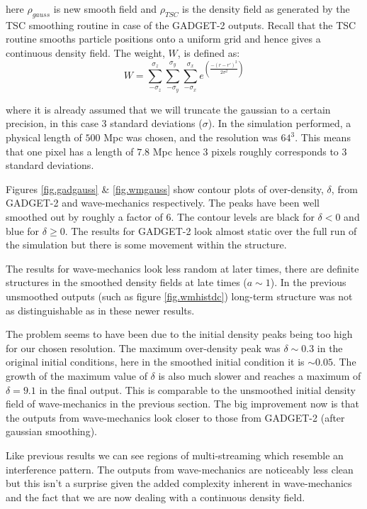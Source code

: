 \noindent here $\rho_{gauss}$ is new smooth field and $\rho_{TSC}$ is the density field as generated by the TSC smoothing routine in case of the GADGET-2 outputs. Recall that the TSC routine smooths particle positions onto a uniform grid and hence gives a continuous density field. The weight, $W$, is defined as:
\begin{equation}
W = \sum_{-\sigma_z}^{\sigma_z} \sum_{-\sigma_y}^{\sigma_y} \sum_{-\sigma_x}^{\sigma_x} e^{\left(\frac{-(r-r')^2}{2 \sigma^2} \right)}
\end{equation}

\noindent where it is already assumed that we will truncate the gaussian to a certain precision, in this case 3 standard deviations ($\sigma$). In the simulation performed, a physical length of $500$ Mpc was chosen, and the resolution was $64^3$. This means that one pixel has a length of $7.8$ Mpc hence 3 pixels roughly corresponds to 3 standard deviations.

Figures \ref{fig.gadgauss} \& \ref{fig.wmgauss} show contour plots of over-density, $\delta$, from GADGET-2 and wave-mechanics respectively. The peaks have been well smoothed out by roughly a factor of 6. The contour levels are black for $\delta < 0$ and blue for $\delta \geq 0$. The results for GADGET-2 look almost static over the full run of the simulation but there is some movement within the structure.

The results for wave-mechanics look less random at later times, there are definite structures in the smoothed density fields at late times ($a \sim 1$). In the previous unsmoothed outputs (such as figure \ref{fig.wmhistdc}) long-term structure was not as distinguishable as in these newer results.

The problem seems to have been due to the initial density peaks being too high for our chosen resolution. The maximum over-density peak was $\delta \sim 0.3$ in the original initial conditions, here in the smoothed initial condition it is $\sim 0.05$. The growth of the maximum value of $\delta$ is also much slower and reaches a maximum of $\delta = 9.1$ in the final output. This is comparable to the unsmoothed initial density field of wave-mechanics in the previous section. The big improvement now is that the outputs from wave-mechanics look closer to those from GADGET-2 (after gaussian smoothing).

Like previous results we can see regions of multi-streaming which resemble an interference pattern. The outputs from wave-mechanics are noticeably less clean but this isn't a surprise given the added complexity inherent in wave-mechanics and the fact that we are now dealing with a continuous density field.


